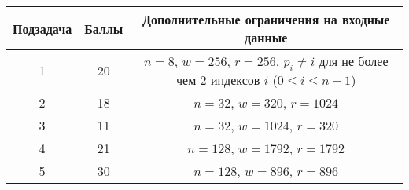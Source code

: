 \begin{center}
\renewcommand{\arraystretch}{1.5}
\begin{tabular}{|c|c|c|}
\hline
Подзадача & Баллы & Дополнительные ограничения на входные данные\\
\hline
1 & 20 & $n = 8$, $w = 256$, $r = 256$, $p_i \neq i$ для не более чем 2 индексов $i$ ($0 \le i \leq n - 1$) \\
\hline
2 & 18 & $n = 32$, $w = 320$, $r = 1024$ \\
\hline
3 & 11 & $n = 32$, $w = 1024$, $r = 320$ \\
\hline
4 & 21 & $n = 128$, $w = 1792$, $r = 1792$ \\
\hline
5 & 30 & $n = 128$, $w = 896$, $r = 896$ \\
\hline
\end{tabular}
\end{center}
